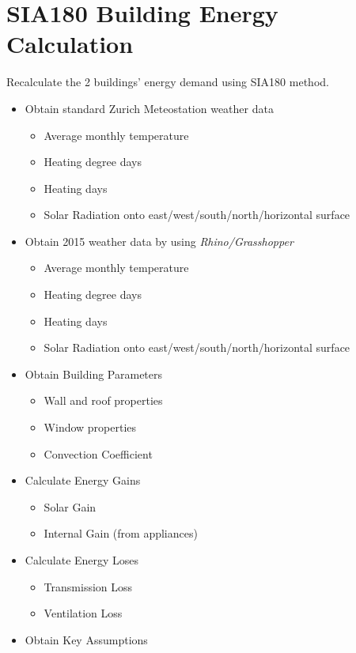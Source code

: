 \documentclass[11pt, a4paper]{article}
\theoremstyle{definition}
\begin{document}
\section{SIA180 Building Energy Calculation}
	Recalculate the 2 buildings' energy demand using SIA180 method. 
	\begin{itemize}
		\item Obtain standard Zurich Meteostation weather data
			\begin{itemize}
				\item Average monthly temperature
				\item Heating degree days
				\item Heating days
				\item Solar Radiation onto east/west/south/north/horizontal surface
			\end{itemize}
		\item Obtain 2015 weather data by using \textit{Rhino/Grasshopper}
			\begin{itemize}
				\item Average monthly temperature
				\item Heating degree days
				\item Heating days
				\item Solar Radiation onto east/west/south/north/horizontal surface
			\end{itemize}
		\item Obtain Building Parameters
			\begin{itemize}
				\item Wall and roof properties
				\item Window properties
				\item Convection Coefficient
			\end{itemize}
		\item Calculate Energy Gains
			\begin{itemize}
				\item Solar Gain
				\item Internal Gain (from appliances)
			\end{itemize}
		\item Calculate Energy Loses
			\begin{itemize}
				\item Transmission Loss
				\item Ventilation Loss
			\end{itemize}
		\item Obtain Key Assumptions	
	\end{itemize}
	
\end{document}
